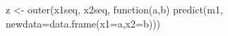 \begin{Schunk}
\begin{Sinput}
 z <- outer(x1seq, x2seq, function(a,b) predict(m1, newdata=data.frame(x1=a,x2=b)))
\end{Sinput}
\end{Schunk}
